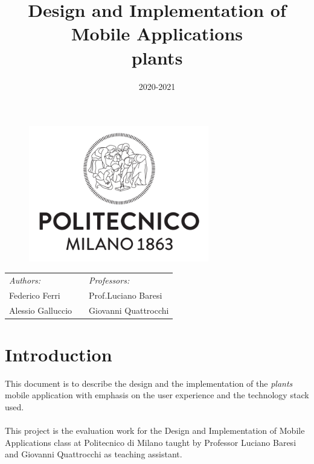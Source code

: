 \documentclass[10pt]{article}
\title{Design and Implementation of Mobile Applications\\plants}
\date{2020-2021}
\begin{document}
	\begin{titlepage}
		\begin{figure}[t]
			\centering\includegraphics[width=0.7\textwidth]{resources/logo_polimi}
		\end{figure}
		\maketitle
		
		\large
		\begin{tabularx}{\linewidth}{@{}lXl@{}}
			\textit{Authors:}  & & \textit{Professors:} \\
			Federico Ferri  & & Prof.\@ Luciano Baresi\\
			Alessio Galluccio  & & Giovanni Quattrocchi\\
		\end{tabularx}		
		\thispagestyle{empty}
	\end{titlepage}
	
	\tableofcontents
	\newpage
	
	\section{Introduction}
	This document is to describe the design and the implementation of the \textit{plants} mobile application with emphasis on the user experience and the technology stack used. \\\\
	This project is the evaluation work for the Design and Implementation of Mobile Applications class at Politecnico di Milano taught by Professor Luciano Baresi and Giovanni Quattrocchi as teaching assistant.
	
\end{document}
